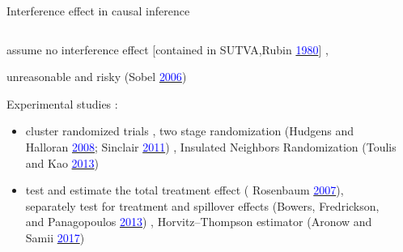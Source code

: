 \documentclass[notes,11pt, aspectratio=169]{beamer}
\begin{document}
\begin{frame}{Interference effect in causal inference}
\begin{columns}[T] %
\begin{column}{0.95\textwidth}
  \begin{wideitemize}
  \item assume no interference effect  [contained in SUTVA,Rubin \href{https://www.jstor.org/stable/2287653}{\textcolor{blue}{ 1980}}] ,   \item unreasonable and risky (Sobel \href{https://www.tandfonline.com/doi/abs/10.1198/016214506000000636}{\textcolor{blue}{2006}})
  \item Experimental studies : 
  \begin{itemize}
  \vspace{10pt}
      \item cluster randomized trials , two stage randomization (Hudgens and Halloran \href{https://www.ncbi.nlm.nih.gov/pmc/articles/PMC2600548/}{\textcolor{blue}{2008}}; Sinclair \href{https://www.cambridge.org/core/books/abs/cambridge-handbook-of-experimental-political-science/design-and-analysis-of-experiments-in-multilevel-populations/5A74D87743BB688894BB8002A837C402}{\textcolor{blue}{2011}}) , Insulated Neighbors Randomization (Toulis and Kao \href{https://proceedings.mlr.press/v28/toulis13.html}{\textcolor{blue}{2013}}) 
      \vspace{10pt}
      \item test and estimate the total treatment effect ( Rosenbaum \href{https://www.tandfonline.com/doi/abs/10.1198/016214506000001112?journalCode=uasa20}{\textcolor{blue}{2007}}), separately test for treatment and spillover effects (Bowers, Fredrickson, and Panagopoulos \href{https://www.cambridge.org/core/journals/political-analysis/article/abs/reasoning-about-interference-between-units-a-general-framework/0E2410C1A5666EE5ACA4CBE29AFFFAE7}{\textcolor{blue}{2013}}) ,  Horvitz–Thompson estimator (Aronow and Samii \href{https://arxiv.org/abs/1305.6156}{\textcolor{blue}{2017}})
  \end{itemize} 
  \end{wideitemize}
\end{column}%
\hfill%
\begin{column}{.38\textwidth}
\end{column}%
\end{columns}
\end{frame}
\end{document}
